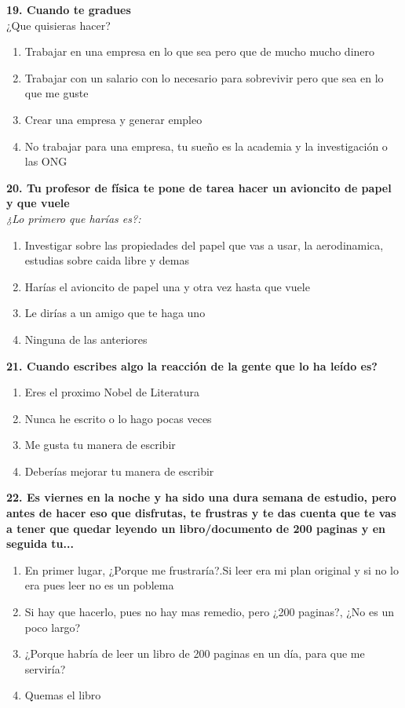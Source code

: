 \documentclass{article}
\begin{document}
\textbf{19. Cuando te gradues }\\
¿Que quisieras hacer?
\begin{enumerate}[label=(\Alph*)]
\item Trabajar en una empresa en lo que sea pero que de mucho mucho dinero
\item Trabajar con un salario con lo necesario para sobrevivir pero que sea en lo que me guste
\item Crear una empresa y generar empleo
\item No trabajar para una empresa, tu sueño es la academia y la investigación o las ONG 
 \end{enumerate}  
 \textbf{20. Tu profesor de física te pone de tarea hacer un avioncito de papel y que vuele}\\
 \emph{¿Lo primero que harías es?:}
\begin{enumerate}
[label=(\Alph*)]
\item Investigar sobre las propiedades del papel que vas a usar, la aerodinamica, estudias sobre caida libre y demas
\item Harías el avioncito de papel una y otra vez hasta que vuele
\item Le dirías a un amigo que te haga uno
\item Ninguna de las anteriores
\end{enumerate}
\textbf{21.  Cuando escribes algo la reacción de la gente que lo ha leído es? }
\begin{enumerate}
[label=(\Alph*)]
\item Eres el proximo Nobel de Literatura
\item Nunca he escrito o lo hago pocas veces
\item Me gusta tu manera de escribir
\item Deberías mejorar tu manera de escribir
\end{enumerate}
\textbf{22. Es viernes en la noche y ha sido una dura semana de estudio, pero antes de hacer eso que disfrutas, te frustras y te das cuenta
que te vas a tener que quedar leyendo un libro/documento de 200 paginas  y en seguida tu...} 
 \begin{enumerate}[label=(\Alph*)]
 \item En primer lugar, ¿Porque me frustraría?.Si leer era mi plan original  y si no lo era pues leer no es un poblema
 \item Si hay que hacerlo, pues no hay mas remedio, pero ¿200 paginas?, ¿No es un poco largo?
 \item ¿Porque habría de leer un libro de 200 paginas en un día, para que me serviría?
 \item Quemas el libro 
 \end{enumerate}
\end{document}
